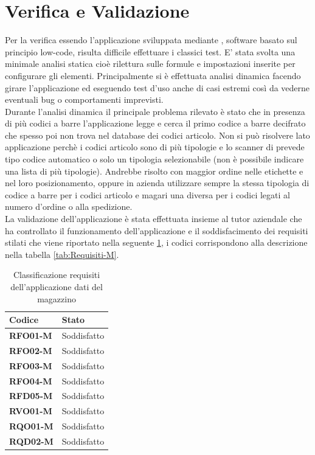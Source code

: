 \section{Verifica e Validazione}\label{sec:1App-Verifica}
Per la verifica essendo l'applicazione sviluppata mediante , software basato sul principio low-code, risulta difficile effettuare i classici test.
E' stata svolta una minimale analisi statica cioè rilettura sulle formule e impostazioni inserite per configurare gli elementi.
Principalmente si è effettuata analisi dinamica facendo girare l'applicazione ed eseguendo test d'uso anche di casi estremi così da vederne eventuali bug o comportamenti imprevisti.\\
Durante l'analisi dinamica il principale problema rilevato è stato che in presenza di più codici a barre l'applicazione legge e cerca il primo codice a barre decifrato che spesso poi non trova nel database dei codici articolo.
Non si può risolvere lato applicazione perchè i codici articolo sono di più tipologie e lo scanner di  prevede tipo codice automatico o solo un tipologia selezionabile (non è possibile indicare una lista di più tipologie).
Andrebbe risolto con maggior ordine nelle etichette e nel loro posizionamento, oppure in azienda utilizzare sempre la stessa tipologia di codice a barre per i codici articolo e magari una diversa per i codici legati al numero d'ordine o alla spedizione.\\
La validazione dell'applicazione è stata effettuata insieme al tutor aziendale che ha controllato il funzionamento dell'applicazione e il soddisfacimento dei requisiti stilati che viene riportato nella seguente \tablename \space \ref{tab:RequisitiSoddisfatti-M}, i codici corrispondono alla descrizione nella tabella \ref{tab:Requisiti-M}.
\renewcommand{\arraystretch}{1.5} %
\begin{table}[H]
\begin{center}
  \begin{tabular}{ |m{6em}|m{6em}| }
    \hline
    \textbf{Codice} & \textbf{Stato} \\
    \hline
    \textbf{RFO01-M} & Soddisfatto\\
    \hline
    \textbf{RFO02-M} & Soddisfatto\\
    \hline
    \textbf{RFO03-M} & Soddisfatto\\
    \hline
    \textbf{RFO04-M} & Soddisfatto\\
    \hline
    \textbf{RFD05-M} & Soddisfatto\\
    \hline
    \textbf{RVO01-M} & Soddisfatto\\
    \hline
    \textbf{RQO01-M} & Soddisfatto\\
    \hline
    \textbf{RQD02-M} & Soddisfatto\\
    \hline
  \end{tabular}
\caption{Classificazione requisiti dell'applicazione dati del magazzino}
\label{tab:RequisitiSoddisfatti-M}
\end{center}
\end{table}
